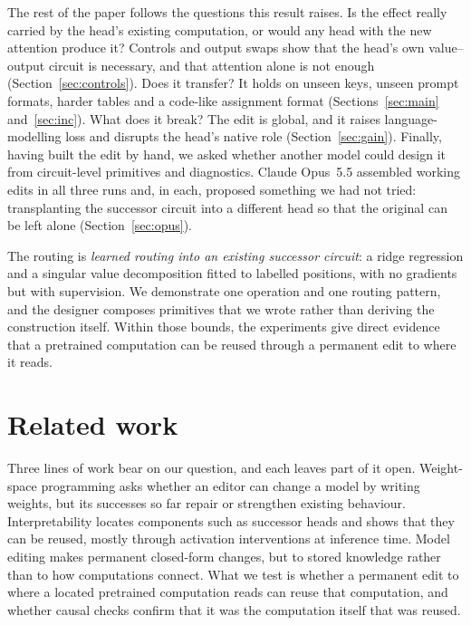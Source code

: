 \documentclass[11pt]{article}
\begin{document}
The rest of the paper follows the questions this result raises. Is the effect really carried by the head's existing computation, or would any head with the new attention produce it? Controls and output swaps show that the head's own value--output circuit is necessary, and that attention alone is not enough (Section~\ref{sec:controls}). Does it transfer? It holds on unseen keys, unseen prompt formats, harder tables and a code-like assignment format (Sections~\ref{sec:main} and~\ref{sec:inc}). What does it break? The edit is global, and it raises language-modelling loss and disrupts the head's native role (Section~\ref{sec:gain}). Finally, having built the edit by hand, we asked whether another model could design it from circuit-level primitives and diagnostics. Claude Opus~5.5 assembled working edits in all three runs and, in each, proposed something we had not tried: transplanting the successor circuit into a different head so that the original can be left alone (Section~\ref{sec:opus}).

The routing is \emph{learned routing into an existing successor circuit}: a ridge regression and a singular value decomposition fitted to labelled positions, with no gradients but with supervision. We demonstrate one operation and one routing pattern, and the designer composes primitives that we wrote rather than deriving the construction itself. Within those bounds, the experiments give direct evidence that a pretrained computation can be reused through a permanent edit to where it reads.

\section{Related work}

Three lines of work bear on our question, and each leaves part of it open. Weight-space programming asks whether an editor can change a model by writing weights, but its successes so far repair or strengthen existing behaviour. Interpretability locates components such as successor heads and shows that they can be reused, mostly through activation interventions at inference time. Model editing makes permanent closed-form changes, but to stored knowledge rather than to how computations connect. What we test is whether a permanent edit to where a located pretrained computation reads can reuse that computation, and whether causal checks confirm that it was the computation itself that was reused.
\end{document}
